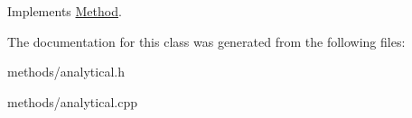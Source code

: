 Implements \hyperlink{classMethod_af3dcec8e066214e82d8b4578a4a55076}{Method}.



The documentation for this class was generated from the following files\+:\begin{DoxyCompactItemize}
\item 
methods/analytical.\+h\item 
methods/analytical.\+cpp\end{DoxyCompactItemize}
